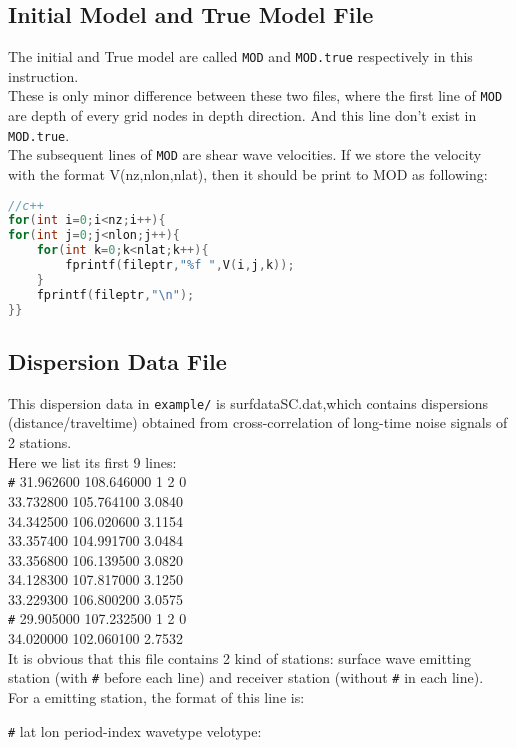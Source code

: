 \documentclass[UTF8]{article}
\begin{document}
    \subsection{Initial Model and True Model File}
    The initial and True model are called \verb!MOD! and \verb!MOD.true! respectively in this instruction.\\
    These is only minor difference between these two files, where the first line of \verb!MOD!
     are depth of every grid nodes in depth direction. And this line don't exist in \verb!MOD.true!.\\

    The subsequent lines of \verb!MOD! are shear wave velocities. If we store the velocity with the 
    format V(nz,nlon,nlat), then it should be print to MOD as following:
    \begin{lstlisting}[language=c++]
//c++
for(int i=0;i<nz;i++){
for(int j=0;j<nlon;j++){
    for(int k=0;k<nlat;k++){
        fprintf(fileptr,"%f ",V(i,j,k));
    }
    fprintf(fileptr,"\n");
}} 
  \end{lstlisting}

  \subsection{Dispersion Data File}
  This dispersion data in \verb!example/! is surfdataSC.dat,which contains dispersions (distance/traveltime) 
  obtained from cross-correlation of long-time noise signals of 2 stations. \\
   Here we list its first 9 lines:\\
   \verb!#!  31.962600 108.646000 1 2 0\\
    33.732800 105.764100 3.0840\\
    34.342500 106.020600 3.1154\\
    33.357400 104.991700 3.0484\\
    33.356800 106.139500 3.0820\\
    34.128300 107.817000 3.1250\\
    33.229300 106.800200 3.0575\\
    \verb!#! 29.905000 107.232500 1 2 0\\
    34.020000 102.060100 2.7532\\

    It is obvious that this file contains 2 kind of stations: surface wave emitting 
    station (with \verb!#! before each line) and receiver station (without \verb!#! in each line). \\
    For a emitting station, the format of this line is:\\
    \begin{center}
        \verb!#! lat lon period-index wavetype velotype:
    \end{center}
\end{document}
